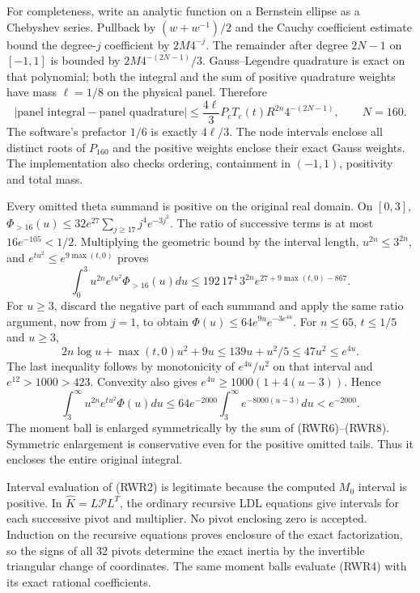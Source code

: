 For completeness, write an analytic function on a Bernstein ellipse
as a Chebyshev series. Pullback by $(w+w^{-1})/2$ and the Cauchy
coefficient estimate bound the degree-$j$ coefficient by $2M4^{-j}$.
The remainder after degree $2N-1$ on $[-1,1]$ is bounded by
$2M4^{-(2N-1)}/3$. Gauss--Legendre quadrature is exact on that
polynomial; both the integral and the sum of positive quadrature
weights have mass $\ell=1/8$ on the physical panel. Therefore
\begin{equation}\tag{RWR6}
 |\text{panel integral}-\text{panel quadrature}|
 \le\frac{4\ell}{3}P_cT_c(t)R^{2n}4^{-(2N-1)},\qquad N=160.
\end{equation}
The software's prefactor $1/6$ is exactly $4\ell/3$.
The node intervals enclose all distinct roots of $P_{160}$ and the
positive weights enclose their exact Gauss weights. The implementation
also checks ordering, containment in $(-1,1)$, positivity and total mass.

Every omitted theta summand is positive on the original real domain.
On $[0,3]$,
$\Phi_{>16}(u)\le32e^{27}\sum_{j\ge17}j^4e^{-3j^2}$.
The ratio of successive terms is at most $16e^{-105}<1/2$.
Multiplying the geometric bound by the interval length, $u^{2n}\le3^{2n}$,
and $e^{tu^2}\le e^{9\max(t,0)}$ proves
\begin{equation}\tag{RWR7}
 \int_0^3u^{2n}e^{tu^2}\Phi_{>16}(u)du
 \le192\,17^4\,3^{2n}e^{27+9\max(t,0)-867}.
\end{equation}
For $u\ge3$, discard the negative part of each summand and apply the
same ratio argument, now from $j=1$, to obtain
$\Phi(u)\le64e^{9u}e^{-3e^{4u}}$.
For $n\le65$, $t\le1/5$ and $u\ge3$,
\[
 2n\log u+\max(t,0)u^2+9u
 \le139u+u^2/5\le47u^2\le e^{4u}.
\]
The last inequality follows by monotonicity of $e^{4u}/u^2$ on that
interval and $e^{12}>1000>423$. Convexity also gives
$e^{4u}\ge1000(1+4(u-3))$. Hence
\begin{equation}\tag{RWR8}
 \int_3^\infty u^{2n}e^{tu^2}\Phi(u)du
 \le64e^{-2000}\int_3^\infty e^{-8000(u-3)}du
 <e^{-2000}.
\end{equation}
The moment ball is enlarged symmetrically by the sum of (RWR6)--(RWR8).
Symmetric enlargement is conservative even for the positive omitted
tails. Thus it encloses the entire original integral.

Interval evaluation of (RWR2) is legitimate because the computed
$M_0$ interval is positive. In $\widehat K=L\mathcal P L^T$, the
ordinary recursive LDL equations give intervals for each successive
pivot and multiplier. No pivot enclosing zero is accepted. Induction
on the recursive equations proves enclosure of the exact factorization,
so the signs of all $32$ pivots determine the exact inertia by the
invertible triangular change of coordinates. The same moment balls
evaluate (RWR4) with its exact rational coefficients.

